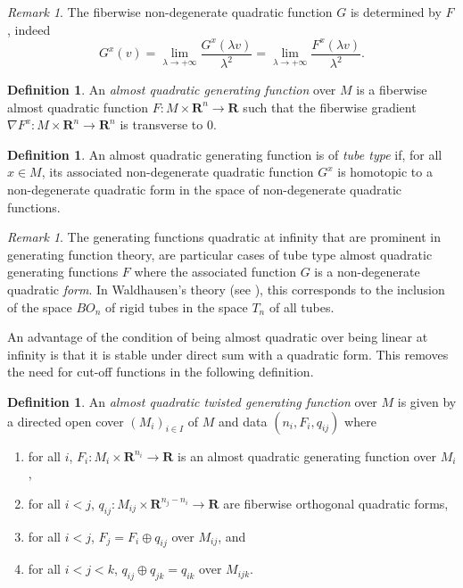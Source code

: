 \documentclass[reqno]{amsart}
\theoremstyle{theorem}
\theoremstyle{remark}
\newtheorem{remark}[corollary]{Remark}
\theoremstyle{definition}
\newtheorem{definition}[corollary]{Definition}
\newcommand{\bR}{\mathbf{R}}
\newcommand{\R}{\mathbf{R}}
\begin{document}
\begin{remark} \label{def:quadratic_function_determined_by_almost} The fiberwise non-degenerate quadratic function $G$ is determined by $F$, indeed 
\[G^x(v) = \lim_{ \lambda \to +\infty} \frac{G^x(\lambda v) }{\lambda^2} = \lim_{ \lambda \to +\infty} \frac{ F^x( \lambda v)}{\lambda^2 }.\]
\end{remark}




\begin{definition}
An \emph{almost quadratic generating function} over $M$ is a fiberwise almost quadratic function
$F:M \times \bR^n \to \R$ such that the fiberwise gradient $\nabla F^x:M\times \R^n\to \R^n$ is transverse to $0$.
\end{definition}


\begin{definition}
An almost quadratic generating function is of \emph{tube type} if, 
for all $x \in M$,  its associated non-degenerate quadratic function $G^x$ is homotopic to a non-degenerate quadratic form in the space of non-degenerate quadratic functions.
\end{definition}


\begin{remark}
The generating functions quadratic at infinity that are prominent in generating function theory, are particular cases of tube type almost quadratic generating functions
$F$ where the associated function $G$ is a non-degenerate quadratic \emph{form}.
In Waldhausen's theory (see \cite{W82}), this corresponds to the inclusion of the space $BO_n$ of rigid tubes in the space $T_n$ of all tubes.
\end{remark}


An advantage of the condition of being almost quadratic over being linear at infinity is that it is stable under direct sum with a quadratic form.
This removes the need for cut-off functions in the following definition.


\begin{definition}
An \emph{almost quadratic twisted generating function} over $M$ is given
by a directed open cover $(M_i)_{i\in I}$ of $M$ and data $(n_i,F_i,q_{ij})$ where
\begin{enumerate}
\item for all $i$, $F_i:M_i\times \R^{n_i} \to \R$ is an almost quadratic generating function over $M_i$,
\item for all $i<j$, $q_{ij}:M_{ij}\times \R^{n_j-n_i} \to \R$ are fiberwise orthogonal quadratic forms,
\item for all $i<j$, $F_j=F_i \oplus q_{ij}$ over $M_{ij}$, and
\item for all $i<j<k$, $q_{ij}\oplus q_{jk}=q_{ik}$ over $M_{ijk}$.
\end{enumerate}
\end{definition}
\end{document}
